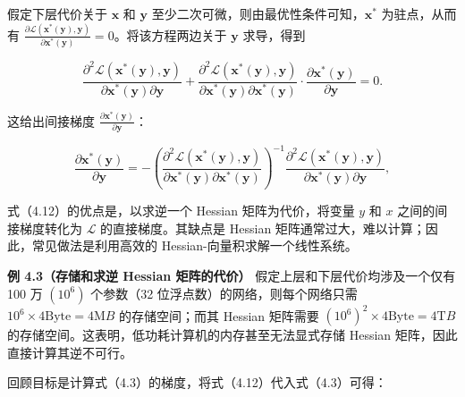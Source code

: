 假定下层代价关于 $\pmb{x}$ 和 $\pmb{y}$ 至少二次可微，则由最优性条件可知，$\pmb{x}^{*}$ 为驻点，从而有 $\frac{\partial \mathcal{L}(\pmb{x}^{*}(\pmb{y}), \pmb{y})}{\partial \pmb{x}^{*}(\pmb{y})} = 0$。将该方程两边关于 $\pmb{y}$ 求导，得到

\begin{equation}
\frac {\partial^ {2} \mathcal {L} (\boldsymbol {x} ^ {*} (\boldsymbol {y}) , \boldsymbol {y})}{\partial \boldsymbol {x} ^ {*} (\boldsymbol {y}) \partial \boldsymbol {y}} + \frac {\partial^ {2} \mathcal {L} (\boldsymbol {x} ^ {*} (\boldsymbol {y}) , \boldsymbol {y})}{\partial \boldsymbol {x} ^ {*} (\boldsymbol {y}) \partial \boldsymbol {x} ^ {*} (\boldsymbol {y})} \cdot \frac {\partial \boldsymbol {x} ^ {*} (\boldsymbol {y})}{\partial \boldsymbol {y}} = 0.\tag{4.11}
\end{equation}

这给出间接梯度 $\frac { \partial \pmb { x } ^ { * } ( \pmb { y } ) } { \partial \pmb { y } }$：

\begin{equation}
\frac {\partial \boldsymbol {x} ^ {*} (\boldsymbol {y})}{\partial \boldsymbol {y}} = - \left(\frac {\partial^ {2} \mathcal {L} (\boldsymbol {x} ^ {*} (\boldsymbol {y}) , \boldsymbol {y})}{\partial \boldsymbol {x} ^ {*} (\boldsymbol {y}) \partial \boldsymbol {x} ^ {*} (\boldsymbol {y})}\right) ^ {- 1} \frac {\partial^ {2} \mathcal {L} (\boldsymbol {x} ^ {*} (\boldsymbol {y}) , \boldsymbol {y})}{\partial \boldsymbol {x} ^ {*} (\boldsymbol {y}) \partial \boldsymbol {y}},\tag{4.12}
\end{equation}

式（4.12）的优点是，以求逆一个 Hessian 矩阵为代价，将变量 $y$ 和 $x$ 之间的间接梯度转化为 $\mathcal { L }$ 的直接梯度。其缺点是 Hessian 矩阵通常过大，难以计算；因此，常见做法是利用高效的 Hessian-向量积求解一个线性系统。

\textbf{例 4.3（存储和求逆 Hessian 矩阵的代价）} 假定上层和下层代价均涉及一个仅有 100 万 $( 1 0 ^ { 6 } )$ 个参数（32 位浮点数）的网络，则每个网络只需 $1 0 ^ { 6 } \times 4 \mathrm { B y t e } = 4 \mathrm { M } B$ 的存储空间；而其 Hessian 矩阵需要 $( 1 0 ^ { 6 } ) ^ { 2 } \times 4 \mathrm { B y t e } = 4 \mathrm { T } B$ 的存储空间。这表明，低功耗计算机的内存甚至无法显式存储 Hessian 矩阵，因此直接计算其逆不可行。

回顾目标是计算式（4.3）的梯度，将式（4.12）代入式（4.3）可得：

